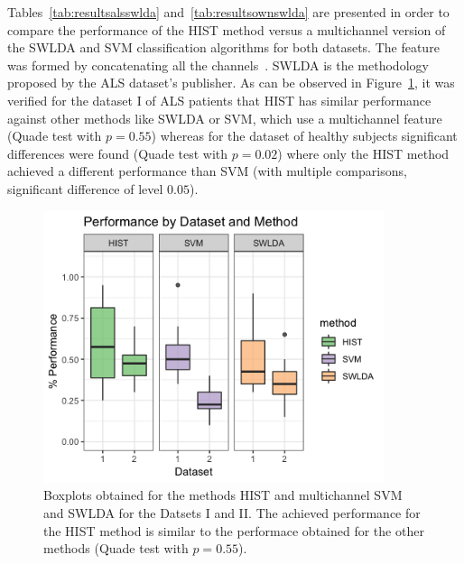 
Tables~\ref{tab:resultsalsswlda} and~\ref{tab:resultsownswlda} are presented in order to compare the performance of the HIST method versus a multichannel version of the SWLDA and SVM classification algorithms for both datasets.  The feature was formed by concatenating all the channels~\cite{Krusienski2006}.  SWLDA is the methodology proposed by the ALS dataset's publisher.  As can be observed in Figure~\ref{fig:boxplots}, it was verified for the dataset I of ALS patients that HIST has similar performance  against other methods like SWLDA or SVM, which use a multichannel feature (Quade test with $p=0.55$) whereas for the dataset of healthy subjects significant differences were found (Quade test with $p=0.02$) where only the HIST method achieved a different performance than SVM (with multiple comparisons, significant difference of level $0.05$).

\begin{figure}[h!]
\centering
\includegraphics[width=10cm]{images/boxplots.png}
\caption[Dataset I and II Performance Boxplots]{Boxplots obtained for the methods HIST and multichannel SVM and SWLDA for the Datsets I and II.  The achieved performance for the HIST method is similar to the performace obtained for the other methods (Quade test with $p=0.55$).}
\label{fig:boxplots}
\end{figure}

